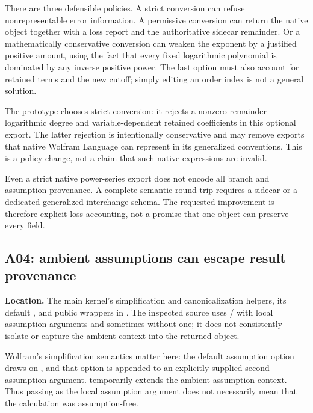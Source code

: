 There are three defensible policies. A strict conversion can refuse nonrepresentable error information. A permissive conversion can return the native object together with a loss report and the authoritative sidecar remainder. Or a mathematically conservative conversion can weaken the exponent by a justified positive amount, using the fact that every fixed logarithmic polynomial is dominated by any inverse positive power. The last option must also account for retained terms and the new cutoff; simply editing an order index is not a general solution.

The prototype chooses strict conversion: it rejects a nonzero remainder logarithmic degree and variable-dependent retained coefficients in this optional export. The latter rejection is intentionally conservative and may remove exports that native Wolfram Language can represent in its generalized conventions. This is a policy change, not a claim that such native expressions are invalid.

Even a strict native power-series export does not encode all branch and assumption provenance. A complete semantic round trip requires a sidecar or a dedicated generalized interchange schema. The requested improvement is therefore explicit loss accounting, not a promise that one  object can preserve every field.

\subsection{A04: ambient assumptions can escape result provenance}\label{sec:a04}

\textbf{Location.} The main kernel's simplification and canonicalization helpers, its default , and public wrappers in . The inspected source uses / with local assumption arguments and sometimes without one; it does not consistently isolate  or capture the ambient context into the returned object.\cite{core,inverseexpressions}

Wolfram's simplification semantics matter here: the default assumption option draws on , and that option is appended to an explicitly supplied second assumption argument.  temporarily extends the ambient assumption context. Thus passing  as the local assumption argument does not necessarily mean that the calculation was assumption-free.\cite{wl-simplify,wl-assuming,wl-assumptions}

